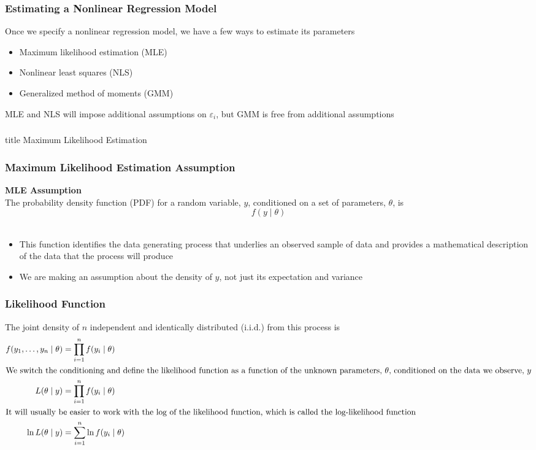 \documentclass{beamer}
\begin{document}
\begin{frame}\frametitle{Estimating a Nonlinear Regression Model}
    Once we specify a nonlinear regression model, we have a few ways to estimate its parameters
    \begin{itemize}
        \item Maximum likelihood estimation (MLE)
        \item Nonlinear least squares (NLS)
        \item Generalized method of moments (GMM)
    \end{itemize}
    \vspace{3ex}
    MLE and NLS will impose additional assumptions on $\varepsilon_i$, but GMM is free from additional assumptions
\end{frame}

\begin{frame}\frametitle{}
    \vfill
    \centering
    \begin{beamercolorbox}[center]{title}
        \Large Maximum Likelihood Estimation
    \end{beamercolorbox}
    \vfill
\end{frame}

\begin{frame}\frametitle{Maximum Likelihood Estimation Assumption}
    \textbf{MLE Assumption} \\
    \vspace{3ex}
    The probability density function (PDF) for a random variable, $y$, conditioned on a set of parameters, $\theta$, is
    $$f(y \mid \theta)$$ \\
    \begin{itemize}
        \item This function identifies the data generating process that underlies an observed sample of data and provides a mathematical description of the data that the process will produce
        \item We are making an assumption about the density of $y$, not just its expectation and variance
    \end{itemize}
\end{frame}

\begin{frame}\frametitle{Likelihood Function}
    The joint density of $n$ independent and identically distributed (i.i.d.) from this process is
    \begin{align*}
        f(y_1, \ldots, y_n \mid \theta) &= \prod_{i = 1}^n f(y_i \mid \theta) \\
        \intertext{We switch the conditioning and define the likelihood function as a function of the unknown parameters, $\theta$, conditioned on the data we observe, $y$}
        L(\theta \mid y) &= \prod_{i = 1}^n f(y_i \mid \theta) \\
        \intertext{It will usually be easier to work with the log of the likelihood function, which is called the log-likelihood function}
        \ln L(\theta \mid y) &= \sum_{i = 1}^n \ln f(y_i \mid \theta)
    \end{align*}
\end{frame}
\end{document}
